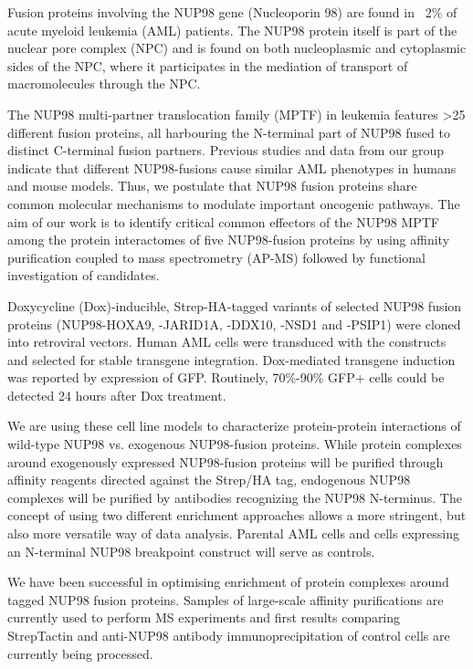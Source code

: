 Fusion proteins involving the NUP98 gene (Nucleoporin 98) are found in ~2\% of acute myeloid leukemia (AML) patients. The NUP98 protein itself is part of the nuclear pore complex (NPC) and is found on both nucleoplasmic and cytoplasmic sides of the NPC, where it participates in the mediation of transport of macromolecules through the NPC.

The NUP98 multi-partner translocation family (MPTF) in leukemia features >25 different fusion proteins, all harbouring the N-terminal part of NUP98 fused to distinct C-terminal fusion partners. Previous studies and data from our group indicate that different NUP98-fusions cause similar AML phenotypes in humans and mouse models. Thus, we postulate that NUP98 fusion proteins share common molecular mechanisms to modulate important oncogenic pathways.
The aim of our work is to identify critical common effectors of the NUP98 MPTF among the protein interactomes of five NUP98-fusion proteins by using affinity purification coupled to mass spectrometry (AP-MS) followed by functional investigation of candidates.

Doxycycline (Dox)-inducible, Strep-HA-tagged variants of selected NUP98 fusion proteins (NUP98-HOXA9, -JARID1A, -DDX10, -NSD1 and -PSIP1) were cloned into retroviral vectors. Human AML cells were transduced with the constructs and selected for stable transgene integration. Dox-mediated transgene induction was reported by expression of GFP. Routinely, 70\%-90\% GFP+ cells could be detected 24 hours after Dox treatment.

We are using these cell line models to characterize protein-protein interactions of wild-type NUP98 vs. exogenous NUP98-fusion proteins. While protein complexes around exogenously expressed NUP98-fusion proteins will be purified through affinity reagents directed against the Strep/HA tag, endogenous NUP98 complexes will be purified by antibodies recognizing the NUP98 N-terminus. The concept of using two different enrichment approaches allows a more stringent, but also more versatile way of data analysis. Parental AML cells and cells expressing an N-terminal NUP98 breakpoint construct will serve as controls.

We have been successful in optimising enrichment of protein complexes around tagged NUP98 fusion proteins. Samples of large-scale affinity purifications are currently used to perform MS experiments and first results comparing StrepTactin and anti-NUP98 antibody immunoprecipitation of control cells are currently being processed.

